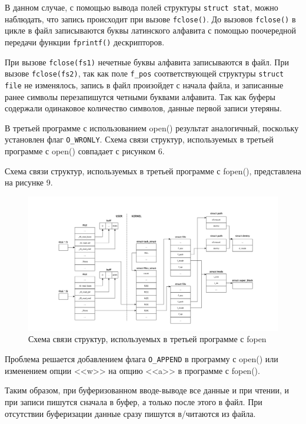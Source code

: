 В данном случае, с помощью вывода полей структуры \texttt{struct stat}, можно наблюдать, что запись происходит при вызове \texttt{fclose()}. До
вызовов \texttt{fclose()} в цикле в файл записываются буквы латинского
алфавита с помощью поочередной передачи функции \texttt{fprintf()} дескрипторов.

При вызове \texttt{fclose(fs1)} нечетные буквы алфавита записываются в файл.
При вызове \texttt{fclose(fs2)}, так как поле \texttt{f\_pos}
соответствующей структуры \texttt{struct file} не изменялось, запись в файл
произойдет с начала файла, и записанные ранее символы перезапишутся четными буквами алфавита.
Так как буферы содержали одинаковое количество символов, данные первой
записи утеряны.

В третьей программе с использованием open() результат аналогичный, поскольку установлен флаг \texttt{O\_WRONLY}. Схема связи структур, используемых в третьей программе с open() совпадает с рисунком 6.

Схема связи структур, используемых в третьей программе с fopen(), представлена на рисунке 9.

\begin{figure}[ht]
	\centering
	\includegraphics[width=\textwidth]{img/33}
	\caption{Схема связи структур, используемых в третьей программе с fopen}
\end{figure}

Проблема решается добавлением флага \texttt{O\_APPEND} в программу с open() или изменением опции <<w>> на опцию <<a>> в программе с fopen().

Таким образом, при буферизованном вводе-выводе все данные и при чтении, и при записи пишутся сначала в буфер, а только после этого в файл. При отсутствии буферизации данные сразу пишутся в/читаются из файла.


